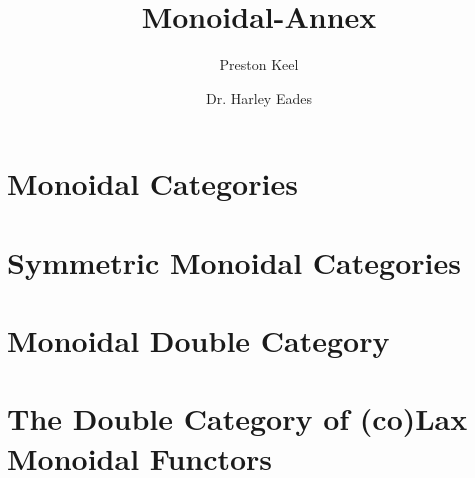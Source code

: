 \documentclass[11pt]{article}
\title{Monoidal-Annex}
\author{Preston Keel \and Dr. Harley Eades}
\begin{document}
\maketitle
\tableofcontents

\section{Monoidal Categories}
\label{sec:monoidal_categories}


\section{Symmetric Monoidal Categories}
\label{sec:symmetric_monoidal_categories}


\section{Monoidal Double Category}
\label{sec:monoidal_double_category}


\section{The Double Category of (co)Lax Monoidal Functors}
\label{sec:the_double_category_of_colax_monoidal_functors}





\end{document}
